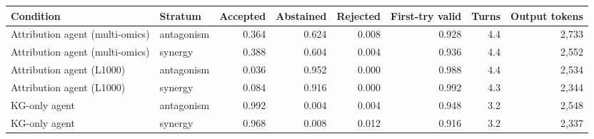 \begin{tabular}{@{}llrrrrrr@{}}
\toprule
Condition & Stratum & Accepted & Abstained & Rejected & First-try valid & Turns & Output tokens \\
\midrule
Attribution agent (multi-omics) & antagonism & 0.364 & 0.624 & 0.008 & 0.928 & 4.4 & 2,733 \\
Attribution agent (multi-omics) & synergy & 0.388 & 0.604 & 0.004 & 0.936 & 4.4 & 2,552 \\
\addlinespace
Attribution agent (L1000) & antagonism & 0.036 & 0.952 & 0.000 & 0.988 & 4.4 & 2,534 \\
Attribution agent (L1000) & synergy & 0.084 & 0.916 & 0.000 & 0.992 & 4.3 & 2,344 \\
\addlinespace
KG-only agent & antagonism & 0.992 & 0.004 & 0.004 & 0.948 & 3.2 & 2,548 \\
KG-only agent & synergy & 0.968 & 0.008 & 0.012 & 0.916 & 3.2 & 2,337 \\
\bottomrule
\end{tabular}
